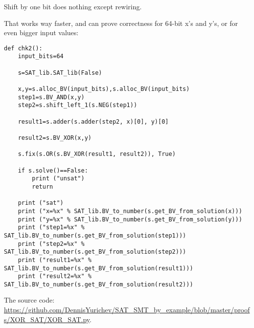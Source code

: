 Shift by one bit does nothing except rewiring.

That works way faster, and can prove correctness for 64-bit x's and y's, or for even bigger input values:

\begin{lstlisting}
def chk2():
    input_bits=64

    s=SAT_lib.SAT_lib(False)

    x,y=s.alloc_BV(input_bits),s.alloc_BV(input_bits)
    step1=s.BV_AND(x,y)
    step2=s.shift_left_1(s.NEG(step1))

    result1=s.adder(s.adder(step2, x)[0], y)[0]

    result2=s.BV_XOR(x,y)

    s.fix(s.OR(s.BV_XOR(result1, result2)), True)

    if s.solve()==False:
        print ("unsat")
        return

    print ("sat")
    print ("x=%x" % SAT_lib.BV_to_number(s.get_BV_from_solution(x)))
    print ("y=%x" % SAT_lib.BV_to_number(s.get_BV_from_solution(y)))
    print ("step1=%x" % SAT_lib.BV_to_number(s.get_BV_from_solution(step1)))
    print ("step2=%x" % SAT_lib.BV_to_number(s.get_BV_from_solution(step2)))
    print ("result1=%x" % SAT_lib.BV_to_number(s.get_BV_from_solution(result1)))
    print ("result2=%x" % SAT_lib.BV_to_number(s.get_BV_from_solution(result2)))
\end{lstlisting}

The source code: \url{https://github.com/DennisYurichev/SAT_SMT_by_example/blob/master/proofs/XOR_SAT/XOR_SAT.py}.


